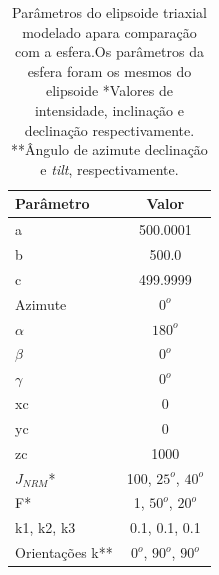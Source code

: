 \begin{table}[h]
	\begin{center}
		\begin{tabular}{|l|c|}
			\hline
			\textbf{Parâmetro}  & \textbf{Valor}  \\
			\hline 
			a   & 500.0001   \\
			\hline
			b   & 500.0  \\
			\hline
			c   & 499.9999 \\
			\hline
			Azimute   & $0^o$ \\
			\hline
			$\alpha$    & $180^o$   \\
			\hline
			$\beta$    & $0^o$ \\
			\hline
			$\gamma$   & $0^o$  \\
			\hline
			xc   & 0  \\
			\hline          
			yc   & 0  \\
			\hline                
			zc   & 1000  \\
			\hline
			$J_{NRM}$*  & 100, $25^o$, $40^o$  \\
			\hline
			F*    & 1, $50^o$, $20^o$ \\
			\hline
			k1, k2, k3   & 0.1, 0.1, 0.1  \\
			\hline
			Orientações k**   & $0^o$, $90^o$, $90^o$  \\
			\hline
		\end{tabular}
		\caption{Parâmetros do elipsoide triaxial modelado apara comparação com a esfera.Os parâmetros da esfera foram os mesmos do elipsoide *Valores de intensidade, inclinação e declinação respectivamente. **Ângulo de azimute
			declinação e \textit{tilt}, respectivamente.}
	\end{center}
	\label{tab:triaxial_sphere}
\end{table}

